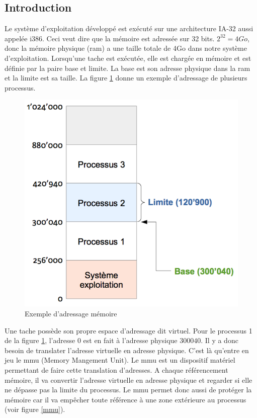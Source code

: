 
\subsection{Introduction}
Le système d'exploitation développé est exécuté sur une architecture \acrshort{IA-32}
aussi appelée i386. Ceci veut dire que la mémoire est adressée sur 32 bits.
$2^{32}=4Go$, donc la mémoire physique (\acrshort{ram}) a une taille totale de
4Go dans notre système d'exploitation. Lorsqu'une tache est exécutée, elle est chargée
en mémoire et est définie par la paire base et limite. La base est son adresse physique
dans la \acrshort{ram} et la limite est sa taille. La figure \ref{ex_base_limit}
donne un exemple d'adressage de plusieurs processus.\cite{ref42}

\begin{figure}[!h]
  \centering
  \includegraphics[scale=0.5]{images/ex_base_limit.png}
  \caption{Exemple d'adressage mémoire}
  \label{ex_base_limit}
\end{figure}

Une tache possède son propre espace d'adressage dit virtuel. Pour le processus 1
de la figure \ref{ex_base_limit}, l'adresse $0$ est en fait à l'adresse physique
$300040$. Il y a donc besoin de translater l'adresse virtuelle en adresse physique.
C'est là qu'entre en jeu le \acrshort{mmu} (Memory Mangement Unit). Le \acrshort{mmu}
est un dispositif matériel permettant de faire cette translation d'adresses. A chaque
référencement mémoire, il va convertir l'adresse virtuelle en adresse physique et
regarder si elle ne dépasse pas la limite du processus. Le \acrshort{mmu} permet donc
aussi de protéger la mémoire car il va empêcher toute référence à une zone extérieure
au processus (voir figure \ref{mmu}).\cite{ref42}

